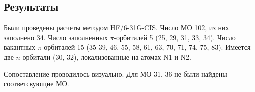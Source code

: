 \subsection{Результаты}
Были проведены расчеты методом HF/6-31G-CIS. Число МО 102, из них заполнено 34. Число заполненных $\pi$-орбиталей 5 (25, 29, 31, 33, 34). Число вакантных $\pi$-орбиталей 15 (35-39, 46, 55, 58, 61, 63, 70, 71, 74, 75, 83). Имеется две $n$-орбитали (30, 32), локализованные на атомах N1 и N2.
\begin{table}[H]
    \caption{Сопоставление молекулярных орбиталей, полученных разными методами}
    \begin{center}
    \label{tab:my-table}
    \end{center}{}
\end{table}

Сопоставление проводилось визуально. Для МО 31, 36 не были найдены соответсвующие МО.

